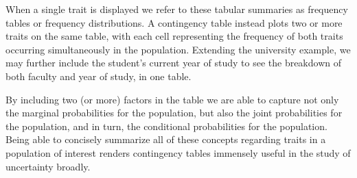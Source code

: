 \documentclass[
  letterpaper,
  DIV=11,
  numbers=noendperiod]{scrreprt}
\theoremstyle{definition}
\theoremstyle{definition}
\theoremstyle{definition}
\theoremstyle{remark}
\begin{document}
When a single trait is displayed we refer to these tabular summaries as
frequency tables or frequency distributions. A contingency table instead
plots two or more traits on the same table, with each cell representing
the frequency of both traits occurring simultaneously in the population.
Extending the university example, we may further include the student's
current year of study to see the breakdown of both faculty and year of
study, in one table.

\begin{table}

\caption{\label{tbl-uni-contingency}Frequency of enrolment by faculty
and year of study in a university.}


\end{table}%

By including two (or more) factors in the table we are able to capture
not only the marginal probabilities for the population, but also the
joint probabilities for the population, and in turn, the conditional
probabilities for the population. Being able to concisely summarize all
of these concepts regarding traits in a population of interest renders
contingency tables immensely useful in the study of uncertainty broadly.
\end{document}
